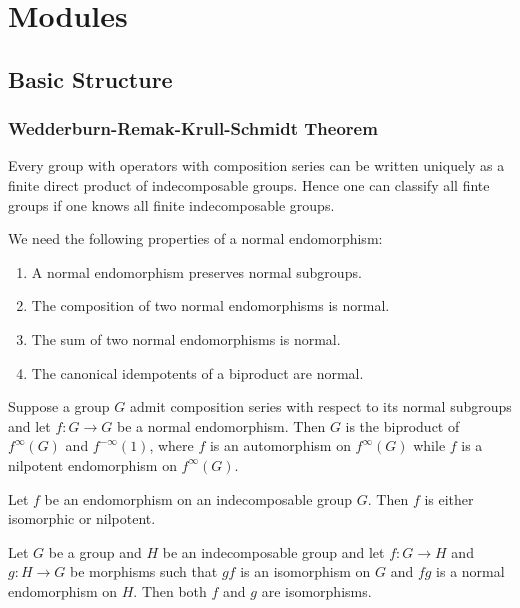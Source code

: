 
\chapter{Modules}

\section{Basic Structure}

\subsection{Wedderburn-Remak-Krull-Schmidt Theorem}

Every group with operators with composition series can be written uniquely as a finite direct product of indecomposable groups. Hence one can classify all finte groups if one knows all finite indecomposable groups.

We need the following properties of a normal endomorphism:
\begin{enumerate}
  \item A normal endomorphism preserves normal subgroups.
  \item The composition of two normal endomorphisms is normal.
  \item The sum of two normal endomorphisms is normal.
  \item The canonical idempotents of a biproduct are normal.
\end{enumerate}

\begin{proposition}
  Suppose a group $G$ admit composition series with respect to its normal subgroups and let $f\colon G\to G$ be a normal endomorphism. Then $G$ is the biproduct of $f^{\infty}(G)$ and $f^{-\infty}(1)$, where $f$ is an automorphism on $f^{\infty}(G)$ while $f$ is a nilpotent endomorphism on $f^{\infty}(G)$.
\end{proposition}

\begin{corollary}
  Let $f$ be an endomorphism on an indecomposable group $G$. Then $f$ is either isomorphic or nilpotent.
\end{corollary}

\begin{corollary}
  Let $G$ be a group and $H$ be an indecomposable group and let $f\colon G\to H$ and $g\colon H\to G$ be morphisms such that $gf$ is an isomorphism on $G$ and $fg$ is a normal endomorphism on $H$. Then both $f$ and $g$ are isomorphisms.
\end{corollary}

